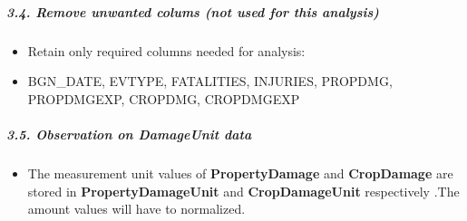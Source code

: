 \documentclass[]{article}
\newenvironment{Shaded}{\begin{snugshade}}{\end{snugshade}}
\newcommand{\KeywordTok}[1]{\textcolor[rgb]{0.13,0.29,0.53}{\textbf{{#1}}}}
\newcommand{\DataTypeTok}[1]{\textcolor[rgb]{0.13,0.29,0.53}{{#1}}}
\newcommand{\StringTok}[1]{\textcolor[rgb]{0.31,0.60,0.02}{{#1}}}
\newcommand{\NormalTok}[1]{{#1}}
\providecommand{\tightlist}{%
  \setlength{\itemsep}{0pt}\setlength{\parskip}{0pt}}
\let\oldsubparagraph\subparagraph
\renewcommand{\subparagraph}[1]{\oldsubparagraph{#1}\mbox{}}
\begin{document}
\subparagraph{3.4. Remove unwanted colums (not used for this
analysis)}\label{remove-unwanted-colums-not-used-for-this-analysis}

\begin{itemize}
\tightlist
\item
  Retain only required columns needed for analysis:
\item
  BGN\_DATE, EVTYPE, FATALITIES, INJURIES, PROPDMG, PROPDMGEXP, CROPDMG,
  CROPDMGEXP
\end{itemize}

\begin{Shaded}
\end{Shaded}

\subparagraph{3.5. Observation on DamageUnit
data}\label{observation-on-damageunit-data}

\begin{itemize}
\tightlist
\item
  The measurement unit values of \textbf{PropertyDamage} and
  \textbf{CropDamage} are stored in \textbf{PropertyDamageUnit} and
  \textbf{CropDamageUnit} respectively .The amount values will have to
  normalized.
\end{itemize}
\end{document}

